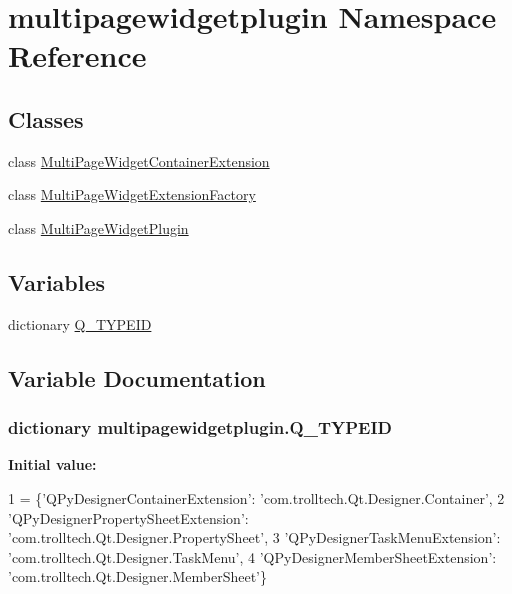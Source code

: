 \hypertarget{namespacemultipagewidgetplugin}{}\section{multipagewidgetplugin Namespace Reference}
\label{namespacemultipagewidgetplugin}
\subsection*{Classes}
\begin{DoxyCompactItemize}
\item 
class \hyperlink{classmultipagewidgetplugin_1_1MultiPageWidgetContainerExtension}{Multi\+Page\+Widget\+Container\+Extension}
\item 
class \hyperlink{classmultipagewidgetplugin_1_1MultiPageWidgetExtensionFactory}{Multi\+Page\+Widget\+Extension\+Factory}
\item 
class \hyperlink{classmultipagewidgetplugin_1_1MultiPageWidgetPlugin}{Multi\+Page\+Widget\+Plugin}
\end{DoxyCompactItemize}
\subsection*{Variables}
\begin{DoxyCompactItemize}
\item 
dictionary \hyperlink{namespacemultipagewidgetplugin_a9ab2d4fb605eb7b90f59c75ef659e1f5}{Q\+\_\+\+T\+Y\+P\+E\+I\+D}
\end{DoxyCompactItemize}


\subsection{Variable Documentation}
\hypertarget{namespacemultipagewidgetplugin_a9ab2d4fb605eb7b90f59c75ef659e1f5}{}
\subsubsection[{Q\+\_\+\+T\+Y\+P\+E\+I\+D}]{\setlength{\rightskip}{0pt plus 5cm}dictionary multipagewidgetplugin.\+Q\+\_\+\+T\+Y\+P\+E\+I\+D}\label{namespacemultipagewidgetplugin_a9ab2d4fb605eb7b90f59c75ef659e1f5}
{\bfseries Initial value\+:}
\begin{DoxyCode}
1 = \{\textcolor{stringliteral}{'QPyDesignerContainerExtension'}:     \textcolor{stringliteral}{'com.trolltech.Qt.Designer.Container'},
2             \textcolor{stringliteral}{'QPyDesignerPropertySheetExtension'}: \textcolor{stringliteral}{'com.trolltech.Qt.Designer.PropertySheet'},
3             \textcolor{stringliteral}{'QPyDesignerTaskMenuExtension'}:      \textcolor{stringliteral}{'com.trolltech.Qt.Designer.TaskMenu'},
4             \textcolor{stringliteral}{'QPyDesignerMemberSheetExtension'}:   \textcolor{stringliteral}{'com.trolltech.Qt.Designer.MemberSheet'}\}
\end{DoxyCode}
